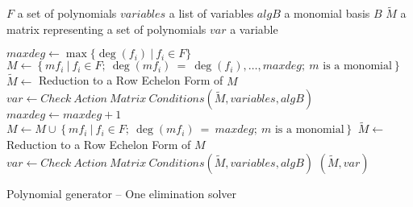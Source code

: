 \begin{algorithm}[ht]
  \begin{algorithmic}[1]
    \Require
      \Statex $F$ a set of polynomials
      \Statex $variables$ a list of variables
      \Statex $algB$ a monomial basis $B$
    \Ensure
      \Statex $\tilde{M}$ a matrix representing a set of polynomials
      \Statex $var$ a variable
      \Statex

    \State $maxdeg \gets \max\{\deg(f_i)\ |\ f_i \in F\}$
    \State $M \gets \left\{m f_i\ |\ f_i \in F;\ \deg(m f_i)\ =\ \deg(f_i),\dots,maxdeg;\ m \textrm{ is a monomial} \right\}$
    \State $\tilde{M} \gets$ Reduction to a Row Echelon Form of $M$
    \State $var \gets Check\ Action\ Matrix\ Conditions(\tilde{M}, variables, algB)$
      \State $maxdeg \gets maxdeg + 1$
      \State $M \gets M \cup \left\{m f_i\ |\ f_i \in F;\ \deg(m f_i)\ = \ maxdeg;\ m \textrm{ is a monomial}\right\}$
      \State $\tilde{M} \gets$ Reduction to a Row Echelon Form of $M$
      \State $var \gets Check\ Action\ Matrix\ Conditions(\tilde{M}, variables, algB)$
    \EndWhile
    \State \Return $(\tilde{M}, var)$
  \end{algorithmic}
  \caption{Polynomial generator -- One elimination solver}
  \label{alg:oneElGen}
\end{algorithm}

